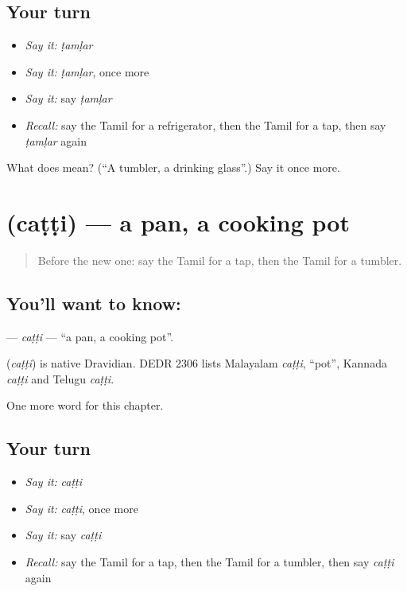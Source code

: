 \subsection*{Your turn}
\begin{itemize}
\raggedright
  \item \emph{Say it:} \emph{ṭamḷar}
  \item \emph{Say it:} \emph{ṭamḷar}, once more
  \item \emph{Say it:} say \emph{ṭamḷar}
  \item \emph{Recall:} say the Tamil for a refrigerator, then the Tamil for a tap, then say \emph{ṭamḷar} again
\end{itemize}

\begin{tcolorbox}[breakable,colback=teal!4,colframe=teal!35!black,title={Before you move on}]
What does  mean? (\textquotedblleft{}A tumbler, a drinking glass\textquotedblright{}.) Say it once more.
\end{tcolorbox}
\section[\texorpdfstring{\ta{சட்டி} (caṭṭi)}{சட்டி (caṭṭi)}]{ (caṭṭi) — a pan, a cooking pot}

\label{lesson:TA-C182-catti}



\begin{quote}
Before the new one: say the Tamil for a tap, then the Tamil for a tumbler.
\end{quote}

\subsection*{You'll want to know: }
\textbf{} — \emph{caṭṭi} — \textquotedblleft{}a pan, a cooking pot\textquotedblright{}.

\begin{cousinweb}
\textbf{} (\emph{caṭṭi}) is native Dravidian. DEDR 2306 lists Malayalam \emph{caṭṭi}, \textquotedblleft{}pot\textquotedblright{}, Kannada \emph{caṭṭi} and Telugu \emph{caṭṭi}.
\end{cousinweb}

\begin{grammarlens}[title={What you've built}]
One more word for this chapter.
\end{grammarlens}

\subsection*{Your turn}
\begin{itemize}
\raggedright
  \item \emph{Say it:} \emph{caṭṭi}
  \item \emph{Say it:} \emph{caṭṭi}, once more
  \item \emph{Say it:} say \emph{caṭṭi}
  \item \emph{Recall:} say the Tamil for a tap, then the Tamil for a tumbler, then say \emph{caṭṭi} again
\end{itemize}

